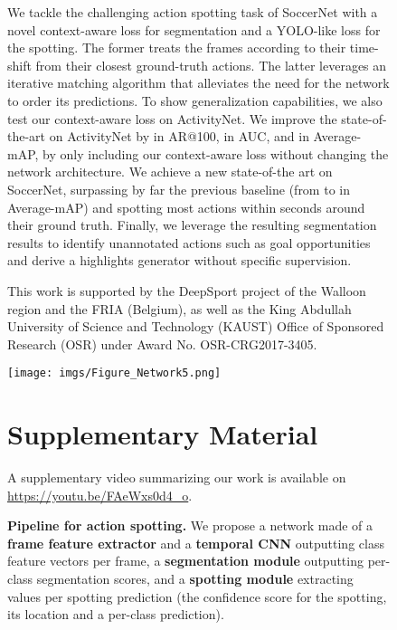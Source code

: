 \documentclass[10pt,twocolumn,letterpaper]{article}
\begin{document}
\begin{figure}[t]
{\begin{minipage}{\linewidth}
We tackle the challenging action spotting task of SoccerNet with a novel context-aware loss for segmentation and a YOLO-like loss for the spotting. The former treats the frames according to their time-shift from their closest ground-truth actions. The latter leverages an iterative matching algorithm that alleviates the need for the network to order its predictions. To show generalization capabilities, we also test our context-aware loss on ActivityNet. We improve the state-of-the-art on ActivityNet by  in AR@100,  in AUC, and  in Average-mAP, by only including our context-aware loss without changing the network architecture. We achieve a new state-of-the art on SoccerNet, surpassing by far the previous baseline (from  to  in Average-mAP) and spotting most actions within  seconds around their ground truth. Finally, we leverage the resulting segmentation results to identify unannotated actions such as goal opportunities and derive a highlights generator without specific supervision.


 This work is supported by the DeepSport project of the Walloon region and the FRIA (Belgium), as well as the King Abdullah University of Science and Technology (KAUST) Office of Sponsored Research (OSR) under Award No. OSR-CRG2017-3405. \clearpage


{\small


}

\clearpage

\begin{figure*}
    \centering
    \texttt{[image: imgs/Figure\_Network5.png]}
    \caption{
    \textbf{Pipeline for action spotting.}
    We propose a network made of
    a \textbf{\color{Orange}frame feature extractor} and a \textbf{\color{Orange} temporal CNN} outputting  class feature vectors per frame,
    a \textbf{\color{NavyBlue}segmentation module} outputting per-class segmentation scores, and 
    a \textbf{\color{Green}spotting module} extracting  values per spotting prediction (\ie the confidence score  for the spotting, its location  and a per-class prediction).
    }
    \label{fig:Network_Supp}
\end{figure*}



\section{Supplementary Material}

A supplementary video summarizing our work is available on 
\url{https://youtu.be/FAeWxs0d4_o}.



\end{minipage}}
\end{figure}
\end{document}
